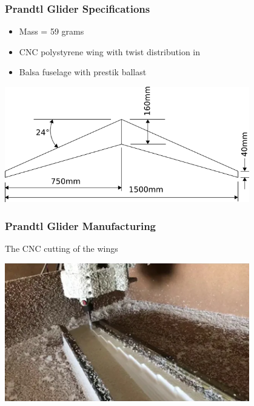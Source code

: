 \documentclass{beamer}
\begin{document}
\begin{frame}
\frametitle{Prandtl Glider Specifications}

\begin{itemize}
\item Mass = 59 grams
\item CNC polystyrene wing with twist distribution in \cite{PrandtlBowers}
\item Balsa fuselage with prestik ballast
\end{itemize}

\begin{center}
\includegraphics[width = 0.8\textwidth]{Pictures/P1Planform.png}
\end{center}

\end{frame}


\begin{frame}
\frametitle{Prandtl Glider Manufacturing}

The CNC cutting of the wings

\begin{center}
    \includegraphics[width = 0.8\textwidth]{Pictures/CNCcutWing.png}
\end{center}    

\end{frame}
\end{document}
